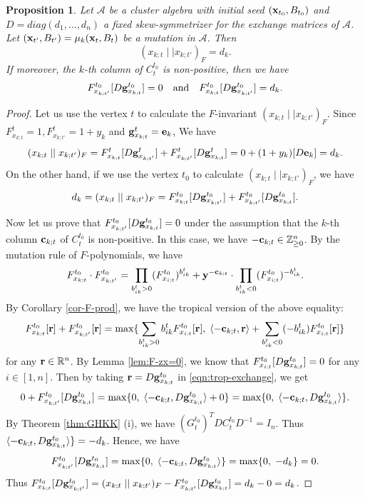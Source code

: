 \documentclass[10pt]{amsart}
\newtheorem{proposition}[theorem]{Proposition}
\theoremstyle{definition}
\theoremstyle{remark}
\numberwithin{equation}{section}
\begin{document}
\begin{proposition}\label{prop:exchange-pair}
    Let $\mathcal A$ be a cluster algebra with initial seed $({\bf x}_{t_0}, B_{t_0})$ and $D=diag(d_1,\ldots,d_n)$ a fixed skew-symmetrizer for the exchange matrices of $\mathcal A$. Let $({\bf x}_{t'}, B_{t'})=\mu_k({\bf x}_t, B_t)$ be a mutation in $\mathcal A$. Then $$(x_{k;t}\mid\mid x_{k;t'})_F=d_k.$$ If moreover, the $k$-th column of $C_t^{t_0}$ is non-positive, then we have  
    \[ F_{x_{k;t'}}^{t_0}[D{\bf g}_{x_{k;t}}^{t_0}]=0\quad\text{and}\quad  F_{x_{k;t}}^{t_0}[D{\bf g}_{x_{k;t'}}^{t_0}]=d_k.
    \]
\end{proposition}
\begin{proof}
 Let us use the vertex $t$ to calculate the $F$-invariant $(x_{k;t}\mid\mid x_{k;t'})_F$. Since
 $F_{x_{k;t}}^t=1, F_{x_{k;t'}}^t=1+y_k$ and ${\bf g}_{x_{k;t}}^t={\bf e}_k$,  We have
 \[
  (x_{k;t}\mid\mid x_{k;t'})_F=F_{x_{k;t}}^t[D{\bf g}_{x_{k;t'}}^t]+F_{x_{k;t'}}^t[D{\bf g}_{x_{k;t}}^t]=0+(1+y_k)[D{\bf e}_k]=d_k.
 \]
 On the other hand, if we use the vertex $t_0$ to calculate $(x_{k;t}\mid\mid x_{k;t'})_F$, we have
\[d_k=(x_{k;t}\mid\mid x_{k;t'})_F=F_{x_{k;t}}^{t_0}[D{\bf g}_{x_{k;t'}}^{t_0}]+F_{x_{k;t'}}^{t_0}[D{\bf g}_{x_{k;t}}^{t_0}].\]


Now let us prove that $F_{x_{k;t'}}^{t_0}[D{\bf g}_{x_{k;t}}^{t_0}]=0$ under the assumption that the $k$-th column ${\bf c}_{k;t}$ of $C_t^{t_0}$ is non-positive. In this case, we have $-{\bf c}_{k;t}\in\mathbb Z_{\geq 0}^n$. By the mutation rule \cite[Proposition 5.1]{fomin_zelevinsky_2007} of $F$-polynomials, we have
\[ F_{x_{k;t}}^{t_0}\cdot F_{x_{k;t'}}^{t_0}=\prod_{b_{ik}^t>0}(F_{x_{i;t}}^{t_0})^{b_{ik}^t}+{\bf y}^{-{\bf c}_{k;t}}\cdot \prod_{b_{ik}^t<0}(F_{x_{i;t}}^{t_0})^{-b_{ik}^t}.
\]
By Corollary \ref{cor-F-prod}, we have the tropical version of the above equality:
\begin{eqnarray}\label{eqn:trop-exchange}
    F_{x_{k;t}}^{t_0}[{\bf r}]+F_{x_{k;t'}}^{t_0}[{\bf r}]=\max\{\sum_{b_{ik}^t>0}b_{ik}^tF_{x_{i;t}}^{t_0}[{\bf r}],\;\langle -{\bf c}_{k;t},{\bf r}\rangle+\sum_{b_{ik}^t<0}(-b_{ik}^t)F_{x_{i;t}}^{t_0}[{\bf r}]\}
\end{eqnarray}
for any ${\bf r}\in\mathbb R^n$.  By Lemma \ref{lem:F-zx=0}, we know that $F_{x_{i;t}}^{t_0}[D{\bf g}_{x_{k;t}}^{t_0}]=0$ for any $i\in[1,n]$. Then by taking ${\bf r}=D{\bf g}_{x_{k;t}}^{t_0}$ in \eqref{eqn:trop-exchange}, we get
\[0+ F_{x_{k;t'}}^{t_0}[D{\bf g}_{x_{k;t}}^{t_0}]=\max\{0,\;\langle -{\bf c}_{k;t},D{\bf g}_{x_{k;t}}^{t_0}\rangle +0\}=\max\{0,\;\langle -{\bf c}_{k;t},D{\bf g}_{x_{k;t}}^{t_0}\rangle\}.\]
By Theorem \ref{thm:GHKK} (i), we have $(G_t^{t_0})^TDC_t^{t_0}D^{-1}=I_n$. Thus $\langle -{\bf c}_{k;t},D{\bf g}_{x_{k;t}}^{t_0}\rangle\}=-d_k$. Hence, we have \[F_{x_{k;t'}}^{t_0}[D{\bf g}_{x_{k;t}}^{t_0}]=\max\{0,\;\langle -{\bf c}_{k;t},D{\bf g}_{x_{k;t}}^{t_0}\rangle\}=\max\{0,\;-d_k\}=0.\]
Thus $F_{x_{k;t}}^{t_0}[D{\bf g}_{x_{k;t'}}^{t_0}]=(x_{k;t}\mid\mid x_{k;t'})_F-F_{x_{k;t'}}^{t_0}[D{\bf g}_{x_{k;t}}^{t_0}]=d_k-0=d_k$.
\end{proof}
\end{document}
